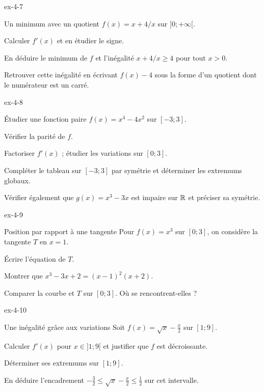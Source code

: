 \begin{blocLivre}{ex-4-7}
\begin{exercice}[2]{Un minimum avec un quotient}
$f(x)=x+4/x$ sur $]0;+\infty[$.
\begin{questions}\item Calculer $f'(x)$ et en étudier le signe.
\item En déduire le minimum de $f$ et l'inégalité $x+4/x\geq4$ pour tout $x>0$.
\item Retrouver cette inégalité en écrivant $f(x)-4$ sous la forme d'un quotient dont le numérateur est un carré.
\end{questions}
\end{exercice}
\end{blocLivre}
\begin{blocLivre}{ex-4-8}
\begin{exercice}[2]{Étudier une fonction paire}
$f(x)=x^4-4x^2$ sur $[-3;3]$.
\begin{questions}\item Vérifier la parité de $f$.
\item Factoriser $f'(x)$ ; étudier les variations sur $[0;3]$.
\item Compléter le tableau sur $[-3;3]$ par symétrie et déterminer les extremums globaux.
\item Vérifier également que $g(x)=x^3-3x$ est impaire sur $\mathbb{R}$ et préciser sa symétrie.
\end{questions}
\end{exercice}
\end{blocLivre}
\begin{blocLivre}{ex-4-9}
\begin{exercice}[2]{Position par rapport à une tangente}
Pour $f(x)=x^3$ sur $[0;3]$, on considère la tangente $T$ en $x=1$.
\begin{questions}\item Écrire l'équation de $T$.
\item Montrer que $x^3-3x+2=(x-1)^2(x+2)$.
\item Comparer la courbe et $T$ sur $[0;3]$. Où se rencontrent-elles ?
\end{questions}
\end{exercice}
\end{blocLivre}
\begin{blocLivre}{ex-4-10}
\begin{exercice}[2]{Une inégalité grâce aux variations}
Soit $f(x)=\sqrt x-\frac x2$ sur $[1;9]$.
\begin{questions}\item Calculer $f'(x)$ pour $x\in]1;9[$ et justifier que $f$ est décroissante.
\item Déterminer ses extremums sur $[1;9]$.
\item En déduire l'encadrement $-\frac32\leq\sqrt x-\frac x2\leq\frac12$ sur cet intervalle.
\end{questions}
\end{exercice}
\end{blocLivre}
